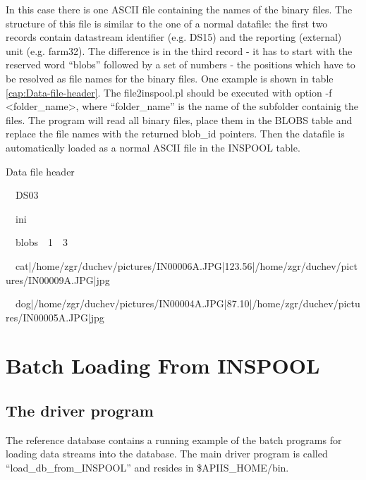 In this case there is one ASCII file containing the names of the binary
files. The structure of this file is similar
to the one of a normal datafile: the first two records contain datastream
identifier (e.g. DS15) and the reporting (external) unit (e.g. farm32).
The difference is in the third record - it has to start with the reserved
word {}``blobs'' followed by a set of numbers - the positions which
have to be resolved as file names for the binary files. One example
is shown in table \ref{cap:Data-file-header}. The file2inspool.pl
should be executed with option -f <folder\_name>, where {}``folder\_name''
is the name of the subfolder containig the files. The program will
read all binary files, place them in the BLOBS table
and replace the file names with the returned blob\_id pointers. Then
the datafile is automatically loaded as a normal ASCII file in the
INSPOOL table. %
\begin{table}

\caption{Data file header\label{cap:Data-file-header}}

\begin{lyxcode}
~{\tiny ~DS03}{\tiny \par}

~{\tiny ~ini}{\tiny \par}

~{\tiny ~blobs~~1~~3}{\tiny \par}

~{\tiny ~cat|/home/zgr/duchev/pictures/IN00006A.JPG|123.56|/home/zgr/duchev/pictures/IN00009A.JPG|jpg}{\tiny \par}

~{\tiny ~dog|/home/zgr/duchev/pictures/IN00004A.JPG|87.10|/home/zgr/duchev/pictures/IN00005A.JPG|jpg}\end{lyxcode}

\end{table}



\section{Batch Loading From INSPOOL}


\subsection{The driver program}

The reference database contains a running example of the batch programs
for loading data streams into the database. The main driver program
is called {}``load\_db\_from\_INSPOOL'' and resides in \$APIIS\_HOME/bin.

